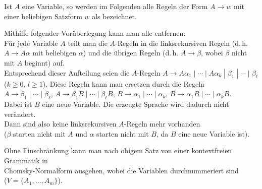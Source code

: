 \begin{Beweis}
    Ist $A$ eine Variable, so werden im Folgenden alle Regeln der Form
    $A \rightarrow w$ mit einer beliebigen Satzform $w$ als
     bezeichnet.
    
    Mithilfe folgender Vorüberlegung kann man alle
     entfernen:\\
    Für jede Variable $A$ teilt man die $A$-Regeln in die linksrekursiven
    Regeln (d.\,h. $A \rightarrow A\alpha$ mit beliebigen $\alpha$) und
    die übrigen Regeln (d.\,h. $A \rightarrow \beta$, wobei $\beta$ nicht mit
    $A$ beginnt) auf.\\
    Entsprechend dieser Aufteilung seien die $A$-Regeln
    $A \rightarrow A\alpha_1 \;|\; \dotsb \;|\; A\alpha_k \;|\;
    \beta_1 \;|\; \dotsb \;|\; \beta_\ell$\\
    ($k \ge 0$, $l \ge 1$).
    Diese Regeln kann man ersetzen durch die Regeln\\
    $A \rightarrow \beta_1 \;|\; \dotsb \;|\; \beta_\ell$,\qquad
    $A \rightarrow \beta_1 B \;|\; \dotsb \;|\; \beta_\ell B$,\qquad
    $B \rightarrow \alpha_1 \;|\; \dotsb \;|\; \alpha_k$,\qquad
    $B \rightarrow \alpha_1 B \;|\; \dotsb \;|\; \alpha_k B$.\\
    Dabei ist $B$ eine neue Variable.
    Die erzeugte Sprache wird dadurch nicht verändert.\\
    Dann sind also keine linksrekursiven $A$-Regeln mehr vorhanden\\
    ($\beta$ starten nicht mit $A$ und $\alpha$ starten nicht mit $B$, da $B$
    eine neue Variable ist).
    
    \pagebreak
    
    Ohne Einschränkung kann man nach obigem Satz von einer kontextfreien
    Grammatik in\\
    Chomsky-Normalform ausgehen, wobei die Variablen durchnummeriert sind\\
    ($V = \{A_1, \dotsc, A_m\}$).
    

\end{Beweis}
